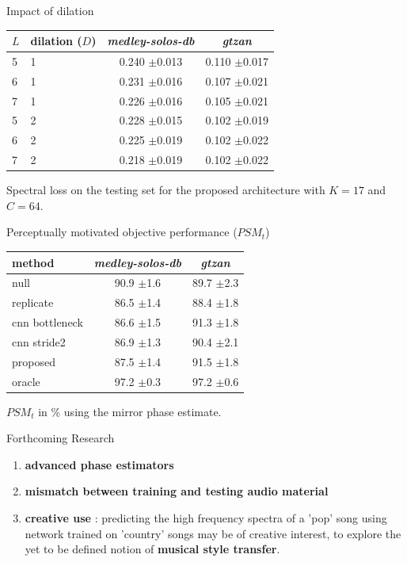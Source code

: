 \documentclass[compress]{beamer}
\begin{document}
\begin{frame}{Impact of dilation}
  \begin{center}
\begin{tabular}{llcc}
$L$ & dilation ($D$) & \textit{medley-solos-db} & \textit{gtzan} \\
\hline
5 & 1 & 0.240 $\pm$0.013 & 0.110 $\pm$0.017 \\
6 & 1 & 0.231 $\pm$0.016 & 0.107 $\pm$0.021 \\
7 & 1 & 0.226 $\pm$0.016 & 0.105 $\pm$0.021 \\
5 & 2 & 0.228 $\pm$0.015 & 0.102 $\pm$0.019 \\
6 & 2 & 0.225 $\pm$0.019 & 0.102 $\pm$0.022 \\
7 & 2 & 0.218 $\pm$0.019 & 0.102 $\pm$0.022 \\
\end{tabular}

Spectral loss on the testing set for the proposed architecture with $K=17$ and $C=64$.
  \end{center}
\end{frame}

\begin{frame}{Perceptually motivated objective performance ($PSM_t$)}
  \begin{center}
  \begin{tabular}{lcc}
  method & \textit{medley-solos-db} & \textit{gtzan} \\
  \hline
  null & 90.9 $\pm$1.6 & 89.7 $\pm$2.3  \\
  replicate & 86.5 $\pm$1.4 & 88.4 $\pm$1.8 \\
  \hline
  cnn bottleneck & 86.6 $\pm$1.5 & 91.3 $\pm$1.8 \\
  cnn stride2 & 86.9 $\pm$1.3 & 90.4 $\pm$2.1 \\
  \hline
  proposed & 87.5 $\pm$1.4 & 91.5 $\pm$1.8 \\
  \hline
  oracle & 97.2 $\pm$0.3 & 97.2 $\pm$0.6 \\
\end{tabular}

  $PSM_t$ in \% using the mirror phase estimate.
  \end{center}
\end{frame}

\begin{frame}{Forthcoming Research}
\begin{enumerate}
  \item \textbf{advanced phase estimators}
  \item \textbf{mismatch between training and testing audio material}
  \item \textbf{creative use} : predicting the high frequency spectra of a 'pop' song using network trained on 'country' songs may be of creative interest, to explore the yet to be defined notion of \textbf{musical style transfer}.
\end{enumerate}
\end{frame}

% 
\end{document}
